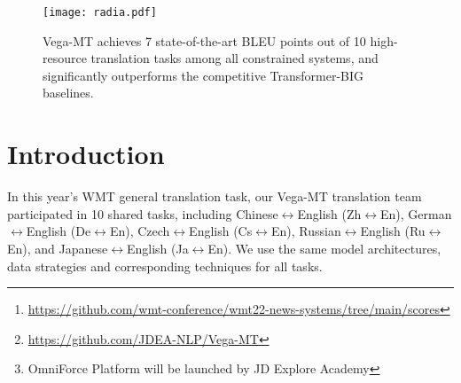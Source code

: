 \documentclass[11pt,a4paper]{article}
\newcommand{\zct}{\color{black}}
\begin{document}
\begin{abstract}
Based on the official automatic scores\footnote{\url{https://github.com/wmt-conference/wmt22-news-systems/tree/main/scores}} of constrained systems, in terms of the \textbf{\textsc{sacreBLEU}}~\cite{post-2018-call} shown in Figure~\ref{fig:radia}, we got the 1$^{\rm st}$ {\zct place in} \{\begin{small}Zh-En (33.5), En-Zh (49.7), De-En (33.7), En-De (37.8), Cs-En (54.9), En-Cs (41.4) and En-Ru (32.7)\end{small}\}, 2$^{\rm nd}$ {\zct place in} \{\begin{small}Ru-En (45.1) and Ja-En (25.6)\end{small}\}, and 3$^{\rm rd}$ {\zct place in} \{\begin{small}En-Ja(41.5)\end{small}\}, respectively; W.R.T the \textbf{\textsc{COMET}}~\cite{rei-etal-2020-comet}, we got the 1$^{\rm st}$ {\zct place in} \{\begin{small}Zh-En (45.1), En-Zh (61.7), De-En (58.0), En-De (63.2), Cs-En (74.7), Ru-En (64.9), En-Ru (69.6) and En-Ja (65.1)\end{small}\}, 2$^{\rm nd}$ {\zct place in} \{\begin{small}En-Cs (95.3) and Ja-En (40.6)\end{small}\}, respectively. Models will be released to facilitate the MT community through GitHub\footnote{\url{https://github.com/JDEA-NLP/Vega-MT}} and OmniForce Platform\footnote{OmniForce Platform will be launched by JD Explore Academy}.
\end{abstract}




\begin{figure}[htb]
    \centering
    \texttt{[image: radia.pdf]}
    \caption{Vega-MT achieves 7 state-of-the-art BLEU points out of 10 high-resource translation tasks among all constrained systems, and significantly outperforms the competitive Transformer-\textsc{BIG} baselines.}
    \label{fig:radia}
\end{figure}

\section{Introduction}
In this year's WMT general translation task, our Vega-MT translation team participated in 10 shared tasks, including Chinese$\leftrightarrow$English (Zh$\leftrightarrow$En), German$\leftrightarrow$English (De$\leftrightarrow$En), Czech$\leftrightarrow$English (Cs$\leftrightarrow$En), Russian$\leftrightarrow$English (Ru$\leftrightarrow$En), and Japanese$\leftrightarrow$English (Ja$\leftrightarrow$En). We use the same model architectures, data strategies and corresponding techniques for all tasks.
\end{document}
